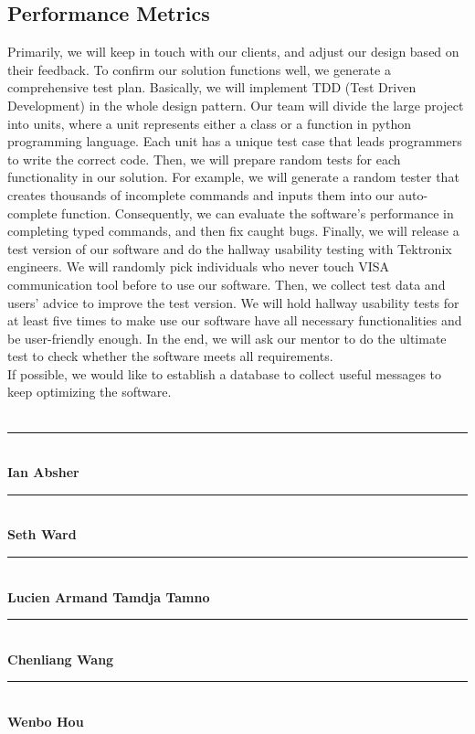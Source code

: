 \documentclass[letterpaper,10pt,notitlepage]{article}
\begin{document}
\subsection{Performance Metrics}
Primarily, we will keep in touch with our clients, and adjust our design based on their feedback. 
\vspace{0.3cm}
\newline
To confirm our solution functions well, we generate a comprehensive test plan. Basically, we will implement TDD (Test Driven Development) in the whole design pattern. Our team will divide the large project into units, where a unit represents either a class or a function in python programming language. Each unit has a unique test case that leads programmers to write the correct code. Then, we will prepare random tests for each functionality in our solution. For example, we will generate a random tester that creates thousands of incomplete commands and inputs them into our auto-complete function. Consequently, we can evaluate the software’s performance in completing typed commands, and then fix caught bugs. Finally, we will release a test version of our software and do the hallway usability testing with Tektronix engineers. We will randomly pick individuals who never touch VISA communication tool before to use our software. Then, we collect test data and users’ advice to improve the test version. We will hold hallway usability tests for at least five times to make use our software have all necessary functionalities and be user-friendly enough. In the end, we will ask our mentor to do the ultimate test to check whether the software meets all requirements. 
\vspace{0.3cm}
\\
If possible, we would like to establish a database to collect useful messages to keep optimizing the software.  \\
\newpage
\textbf{}\\
\vspace{2.0cm} 

\noindent\rule{13cm}{0.4pt}\\
\textbf{Ian Absher}\\
\vspace{2.0cm}

\noindent\rule{13cm}{0.4pt}\\
\textbf{Seth Ward}\\
\vspace{2.0cm} 

\noindent\rule{13cm}{0.4pt}\\
\textbf{Lucien Armand Tamdja Tamno}\\
\vspace{2.0cm} 

\noindent\rule{13cm}{0.4pt}\\
\textbf{Chenliang Wang}\\
\vspace{2.0cm} 

\noindent\rule{13cm}{0.4pt}\\
\textbf{Wenbo Hou}\\
\end{document}
